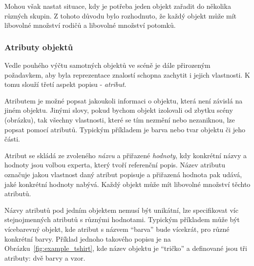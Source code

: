 Mohou však nastat situace, kdy je potřeba jeden objekt zařadit do několika různých skupin.
Z tohoto důvodu bylo rozhodnuto, že každý objekt může mít libovolné množství rodičů a libovolné množství potomků.

\subsubsection{Atributy objektů}
Vedle pouhého výčtu samotných objektů ve scéně je dále přirozeným požadavkem, aby byla reprezentace znalostí schopna zachytit i jejich vlastnosti.
K tomu slouží třetí aspekt popisu - \emph{atribut}.

Atributem je možné popsat jakoukoli informaci o objektu, která není závislá na jiném objektu.
Jinými slovy, pokud bychom objekt izolovali od zbytku scény (obrázku), tak všechny vlastnosti, které se tím nezmění nebo nezaniknou, lze popsat pomocí atributů.
Typickým příkladem je barva nebo tvar objektu či jeho části.

Atribut se skládá ze zvoleného \emph{názvu} a přiřazené \emph{hodnoty}, kdy konkrétní názvy a hodnoty jsou volbou experta, který tvoří referenční popis.
Název atributu označuje jakou vlastnost daný atribut popisuje a přiřazená hodnota pak udává, jaké konkrétní hodnoty nabývá.
Každý objekt může mít libovolné množství těchto atributů.

Názvy atributů pod jedním objektem nemusí být unikátní, lze specifikovat víc stejnojmenných atributů s různými hodnotami.
Typickým příkladem může být vícebarevný objekt, kde atribut s názvem \enquote{barva} bude vícekrát, pro různé konkrétní barvy.
Příklad jednoho takového popisu je na Obrázku~\ref{fig:example_tshirt}, kde název objektu je \enquote{tričko}
a definované jsou tři atributy: dvě barvy a vzor.



